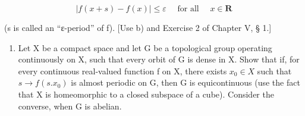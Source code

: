 \[
\left| f (x + s) - f (x) \right| \leqslant \varepsilon \quad \text { for   all } \quad x \in \mathbf {R}
\]

(s is called an ``ε-period'' of f). {[}Use b) and Exercise 2 of Chapter V, § 1.{]}

\begin{enumerate}
\def\labelenumi{\arabic{enumi})}
\setcounter{enumi}{28}
\tightlist
\item
  Let X be a compact space and let G be a topological group operating continuously on X, such that every orbit of G is dense in X. Show that if, for every continuous real-valued function f on X, there exists \(x_{0} \in X\) such that \(s \to f(s.x_{0})\) is almost periodic on G, then G is equicontinuous (use the fact that X is homeomorphic to a closed subspace of a cube). Consider the converse, when G is abelian.
\end{enumerate}
